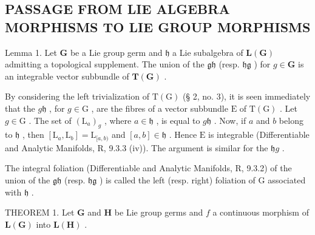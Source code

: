 \subsection{PASSAGE FROM LIE ALGEBRA MORPHISMS TO LIE GROUP MORPHISMS}

Lemma 1. Let \(\mathbf{G}\) be a Lie group germ and \(\mathfrak{h}\) a Lie subalgebra of \(\mathbf{L}(\mathbf{G})\) admitting a topological supplement. The union of the \(\mathfrak{gh}\) (resp. \(\mathfrak{hg}\) ) for \(g\in\mathbf{G}\) is an integrable vector subbundle of \(\mathbf{T}(\mathbf{G})\) .

By considering the left trivialization of \(\mathrm{T}(\mathrm{G})\) (§ 2, no. 3), it is seen immediately that the \(g\mathfrak{h}\) , for \(g\in \mathrm{G}\) , are the fibres of a vector subbundle \(\mathrm{E}\) of \(\mathrm{T}(\mathrm{G})\) . Let \(g\in \mathrm{G}\) . The set of \((\mathrm{L}_a)_g\) , where \(a\in \mathfrak{h}\) , is equal to \(g\mathfrak{h}\) . Now, if \(a\) and \(b\) belong to \(\mathfrak{h}\) , then \([\mathrm{L}_a,\mathrm{L}_b] = \mathrm{L}_{[a,b)}\) and \([a,b]\in \mathfrak{h}\) . Hence \(\mathrm{E}\) is integrable (Differentiable and Analytic Manifolds, R, 9.3.3 (iv)). The argument is similar for the \(\mathfrak{h}g\) .

The integral foliation (Differentiable and Analytic Manifolds, R, 9.3.2) of the union of the \(\mathfrak{gh}\) (resp. \(\mathfrak{hg}\) ) is called the left (resp. right) foliation of G associated with \(\mathfrak{h}\) .

THEOREM 1. Let \(\mathbf{G}\) and \(\mathbf{H}\) be Lie group germs and \(f\) a continuous morphism of \(\mathbf{L}(\mathbf{G})\) into \(\mathbf{L}(\mathbf{H})\) .

